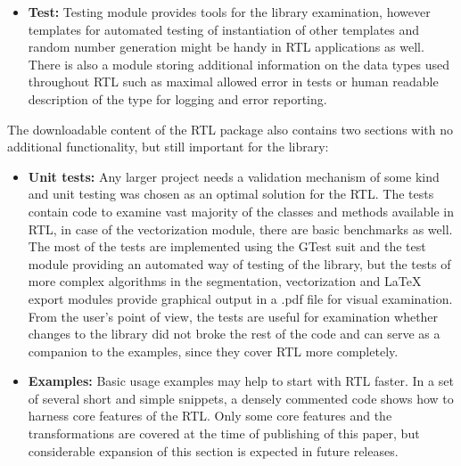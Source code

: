 \documentclass[
    letterpaper, 
    10 pt, 
    conference,
    table,
]{ieeeconf}
\begin{document}
\begin{itemize}
    \item \textbf{Test:} Testing module provides tools for the library examination, however templates for automated testing of instantiation of other templates and random number generation might be handy in RTL applications as well. There is also a module storing additional information on the data types used throughout RTL such as maximal allowed error in tests or human readable description of the type for logging and error reporting.
\end{itemize}

The downloadable content of the RTL package also contains two sections with no additional functionality, but still important for the library:

\begin{itemize}
    \item \textbf{Unit tests:} Any larger project needs a validation mechanism of some kind and unit testing was chosen as an optimal solution for the RTL. The tests contain code to examine vast majority of the classes and methods available in RTL, in case of the vectorization module, there are basic benchmarks as well. The most of the tests are implemented using the GTest suit and the test module providing an automated way of testing of the library, but the tests of more complex algorithms in the segmentation, vectorization and LaTeX export modules provide graphical output in a .pdf file for visual examination. From the user's point of view, the tests are useful for examination whether changes to the library did not broke the rest of the code and can serve as a companion to the examples, since they cover RTL more completely.
    
    \item \textbf{Examples:} Basic usage examples may help to start with RTL faster. In a set of several short and simple snippets, a densely commented code shows how to harness core features of the RTL. Only some core features and the transformations are covered at the time of publishing of this paper, but considerable expansion of this section is expected in future releases.
\end{itemize}
\end{document}
